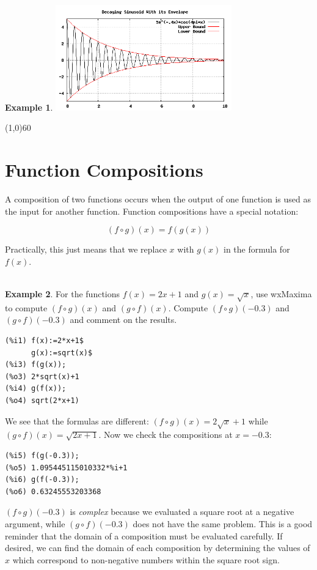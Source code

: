 \documentclass[10.5pt,twoside]{report}
\theoremstyle{definition}
\newtheorem{exmp}{Example}[section]
\begin{document}
\begin{exmp}
\includegraphics[width=3in]{example_2_2_3_2}

\end{exmp}

\line(1,0){60}
\linethickness{0.5mm}

\pagebreak

\section{Function Compositions}\label{Function Compositions}

A composition of two functions occurs when the output of one function is used as the input for another function.  Function compositions have a special notation:

\[(f\circ g)(x) = f(g(x))\]

Practically, this just means that we replace $x$ with $g(x)$ in the formula for $f(x)$.\\

${}$\\
\begin{exmp}
For the functions $f(x)=2x+1$ and $g(x)=\sqrt{x}$, use wxMaxima to compute $(f\circ g)(x)$ and $(g\circ f)(x)$.  Compute $(f\circ g)(-0.3)$ and $(g\circ f)(-0.3)$ and comment on the results.\\

\begin{verbatim}
(%i1) f(x):=2*x+1$
      g(x):=sqrt(x)$
(%i3) f(g(x));
(%o3) 2*sqrt(x)+1
(%i4) g(f(x));
(%o4) sqrt(2*x+1)
\end{verbatim}

We see that the formulas are different:  $(f\circ g)(x)=2\sqrt{x}+1$ while $(g\circ f)(x)=\sqrt{2x+1}$.  Now we check the compositions at $x=-0.3$:

\begin{verbatim}
(%i5) f(g(-0.3));
(%o5) 1.095445115010332*%i+1
(%i6) g(f(-0.3));
(%o6) 0.63245553203368
\end{verbatim}

$(f\circ g)(-0.3)$ is \textit{complex} because we evaluated a square root at a negative argument, while  $(g\circ f)(-0.3)$ does not have the same problem.  This is a good reminder that the domain of a composition must be evaluated carefully.  If desired, we can find the domain of each composition by determining the values of $x$ which correspond to non-negative numbers within the square root sign.

\end{exmp}
\end{document}

